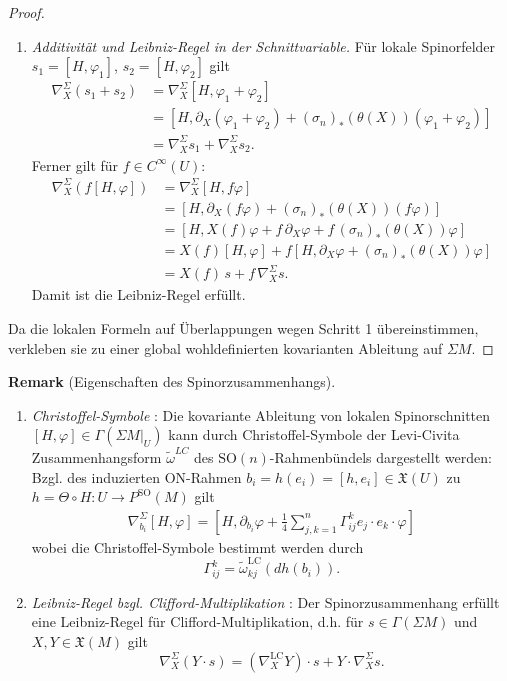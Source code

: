 \documentclass[10pt, letterpaper]{article}
\newcommand{\SO}{\mathrm{SO}}
\newcommand{\CustomHeading}[3]{%
  \par\medskip\noindent%
  \textbf{#1 #2} \textnormal{(#3)}.\enskip%
}
\newenvironment{REM}[2]{\CustomHeading{Remark}{#1}{#2}}{}
\begin{document}
\begin{proof}
\begin{enumerate}
    \medskip

    \item \emph{Additivität und Leibniz-Regel in der Schnittvariable.}
    Für lokale Spinorfelder \(s_1=[H,\varphi_1]\), \(s_2=[H,\varphi_2]\) gilt
    \begin{align*}
    \nabla^\Sigma_X(s_1+s_2)
    &=
    \nabla^\Sigma_X[H,\varphi_1+\varphi_2] \\
    &=
    \left[H,\partial_X(\varphi_1+\varphi_2)+(\sigma_n)_*(\theta(X))(\varphi_1+\varphi_2)\right] \\
    &=
    \nabla^\Sigma_X s_1+\nabla^\Sigma_X s_2.
    \end{align*}
    Ferner gilt für \(f\in C^\infty(U)\):
    \begin{align*}
    \nabla^\Sigma_X(f[H,\varphi])
    &=
    \nabla^\Sigma_X[H,f\varphi] \\
    &=
    \left[H,\partial_X(f\varphi)+(\sigma_n)_*(\theta(X))(f\varphi)\right] \\
    &=
    \left[H,X(f)\varphi+f\,\partial_X\varphi+f\,(\sigma_n)_*(\theta(X))\varphi\right] \\
    &=
    X(f)[H,\varphi]+f\left[H,\partial_X\varphi+(\sigma_n)_*(\theta(X))\varphi\right] \\
    &=
    X(f)\,s+f\,\nabla^\Sigma_X s.
    \end{align*}
    Damit ist die Leibniz-Regel erfüllt.
\end{enumerate}


Da die lokalen Formeln auf Überlappungen wegen Schritt 1 übereinstimmen, verkleben sie zu einer global wohldefinierten kovarianten Ableitung auf \(\Sigma M\).
\end{proof}

\begin{REM}{}{Eigenschaften des Spinorzusammenhangs}
  \begin{enumerate}
    \item \emph{Christoffel-Symbole} \parencite[101]{BaerSpin}: Die kovariante Ableitung von lokalen Spinorschnitten $[H, \varphi ] \in \Gamma(\Sigma M|_U)$ kann durch Christoffel-Symbole der Levi-Civita Zusammenhangsform $\widetilde\omega^{LC}$ des $\SO(n)$-Rahmenbündels dargestellt werden: Bzgl. des induzierten ON-Rahmen $b_i=h(e_i)=[h,e_i]\in\mathfrak{X}(U)$ zu $h=\Theta\circ H:U\to P ^\SO(M)$ gilt
    $$
    \begin{aligned}
    \nabla_{b_i}^{\Sigma} [ H, \varphi ] = [ H, \partial_{b_i} \varphi+\frac{1}{4} \sum_{j, k=1}^n \Gamma_{i j}^k e_j \cdot e_k \cdot \varphi ]
    \end{aligned}
    $$
    wobei die Christoffel-Symbole bestimmt werden durch 
    $$\Gamma_{i j}^k=\widetilde\omega_{k j}^{\mathrm{LC}}\left(d h\left(b_i\right)\right).$$
    \item \emph{Leibniz-Regel bzgl. Clifford-Multiplikation} \parencite[103]{BaerSpin}:  Der Spinorzusammenhang erfüllt eine Leibniz-Regel für Clifford-Multiplikation, d.h. für $s\in\Gamma(\Sigma M)$ und $X, Y \in \mathfrak{X}(M)$ gilt
    $$
    \nabla_X^{\Sigma}(Y \cdot s)=\left(\nabla_X^{\mathrm{LC}} Y\right) \cdot s+Y \cdot \nabla_X^{\Sigma} s.
    $$
  \end{enumerate}
\end{REM}
\end{document}
